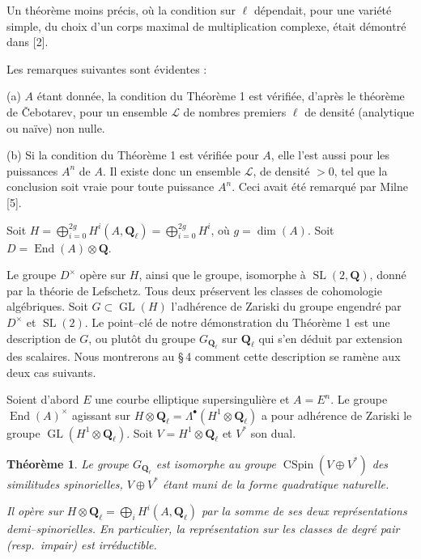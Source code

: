 \documentclass[11pt,a4paper]{article}
\theoremstyle{plain}
\newtheorem{theorem}{Th\'eor\`eme}
\theoremstyle{definition}
\DeclareMathOperator{\End}{End}
\DeclareMathOperator{\CSpin}{CSpin}
\DeclareMathOperator{\SL}{SL}
\DeclareMathOperator{\GL}{GL}
\begin{document}
Un th\'eor\`eme moins pr\'ecis, o\`u la condition sur $\ell$ d\'ependait, pour une vari\'et\'e simple, du choix d'un corps maximal de multiplication complexe, \'etait d\'emontr\'e dans [2].

Les remarques suivantes sont \'evidentes :

(a) $A$ \'etant donn\'ee, la condition du Th\'eor\`eme 1 est v\'erifi\'ee, d'apr\`es le th\'eor\`eme de \v{C}ebotarev, pour un ensemble $\mathcal{L}$ de nombres premiers $\ell$ de densit\'e (analytique ou na\"ive) non nulle.

(b) Si la condition du Th\'eor\`eme 1 est v\'erifi\'ee pour $A$, elle l'est aussi pour les puissances $A^n$ de $A$. Il existe donc un ensemble $\mathcal{L}$, de densit\'e $> 0$, tel que la conclusion soit vraie pour toute puissance $A^n$. Ceci avait \'et\'e remarqu\'e par Milne [5].

Soit $H = \bigoplus_{i=0}^{2g} H^i(A, \mathbf{Q}_\ell) = \bigoplus_{i=0}^{2g} H^i$, o\`u $g = \dim(A)$. Soit $D = \End(A) \otimes \mathbf{Q}$.

Le groupe $D^\times$ op\`ere sur $H$, ainsi que le groupe, isomorphe \`a $\SL(2, \mathbf{Q})$, donn\'e par la th\'eorie de Lefschetz. Tous deux pr\'eservent les classes de cohomologie alg\'ebriques. Soit $G \subset \GL(H)$ l'adh\'erence de Zariski du groupe engendr\'e par $D^\times$ et $\SL(2)$. Le point--cl\'e de notre d\'emonstration du Th\'eor\`eme 1 est une description de $G$, ou plut\^ot du groupe $G_{\mathbf{Q}_\ell}$ sur $\mathbf{Q}_\ell$ qui s'en d\'eduit par extension des scalaires. Nous montrerons au \S\,4 comment cette description se ram\`ene aux deux cas suivants.

Soient d'abord $E$ une courbe elliptique supersinguli\`ere et $A = E^n$. Le groupe $\End(A)^\times$ agissant sur $H \otimes \mathbf{Q}_\ell = \Lambda^\bullet(H^1 \otimes \mathbf{Q}_\ell)$ a pour adh\'erence de Zariski le groupe $\GL(H^1 \otimes \mathbf{Q}_\ell)$. Soit $V = H^1 \otimes \mathbf{Q}_\ell$ et $V^*$ son dual.

\begin{theorem}
Le groupe $G_{\mathbf{Q}_\ell}$ est isomorphe au groupe $\CSpin(V \oplus V^*)$ des similitudes spinorielles, $V \oplus V^*$ \'etant muni de la forme quadratique naturelle.

Il op\`ere sur $H \otimes \mathbf{Q}_\ell = \bigoplus_i H^i(A, \mathbf{Q}_\ell)$ par la somme de ses deux repr\'esentations demi--spinorielles. En particulier, la repr\'esentation sur les classes de degr\'e pair (resp.\ impair) est irr\'eductible.
\end{theorem}
\end{document}
